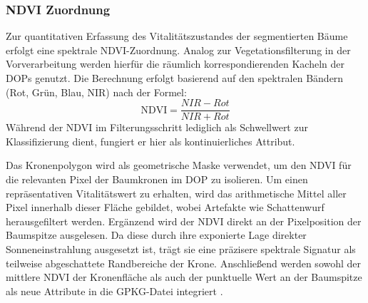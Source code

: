 \subsubsection{NDVI Zuordnung}

Zur quantitativen Erfassung des Vitalitätszustandes der segmentierten Bäume erfolgt eine spektrale NDVI-Zuordnung. Analog zur Vegetationsfilterung in der Vorverarbeitung werden hierfür die räumlich korrespondierenden Kacheln der DOPs genutzt. Die Berechnung erfolgt basierend auf den spektralen Bändern (Rot, Grün, Blau, NIR) nach der Formel:
\begin{equation}
    \text{NDVI} = \frac{NIR - {Rot}} {NIR + {Rot}}
\end{equation}
Während der NDVI im Filterungsschritt lediglich als Schwellwert zur Klassifizierung dient, fungiert er hier als kontinuierliches Attribut.

Das Kronenpolygon wird als geometrische Maske verwendet, um den NDVI für die relevanten Pixel der Baumkronen im DOP zu isolieren. Um einen repräsentativen Vitalitätswert zu erhalten, wird das arithmetische Mittel aller Pixel innerhalb dieser Fläche gebildet, wobei Artefakte wie Schattenwurf herausgefiltert werden. Ergänzend wird der NDVI direkt an der Pixelposition der Baumspitze ausgelesen. Da diese durch ihre exponierte Lage direkter Sonneneinstrahlung ausgesetzt ist, trägt sie eine präzisere spektrale Signatur als teilweise abgeschattete Randbereiche der Krone. Anschließend werden sowohl der mittlere NDVI der Kronenfläche als auch der punktuelle Wert an der Baumspitze als neue Attribute in die GPKG-Datei integriert \cite{munzingerMappingUrbanForest2022}.